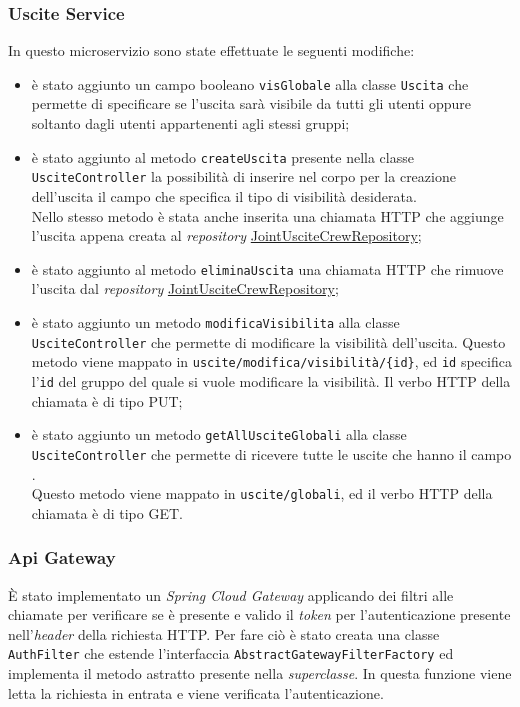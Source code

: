 \subsubsection{Uscite Service}
In questo \gls{microservizio} sono state effettuate le seguenti modifiche:
\begin{itemize}
    \item è stato aggiunto un campo booleano \texttt{visGlobale} alla classe
          \texttt{Uscita} che permette di specificare se l'uscita sarà visibile
          da tutti
          gli utenti oppure soltanto dagli utenti appartenenti agli stessi
          gruppi;
    \item è stato aggiunto al metodo \texttt{createUscita} presente nella
          classe \texttt{UsciteController} la possibilità di inserire nel corpo
          per la
          creazione dell'uscita il campo che specifica il tipo di visibilità
          desiderata.
          \\
          Nello stesso metodo è stata anche inserita una chiamata HTTP che
          aggiunge
          l'uscita appena creata al \textit{repository}
          \hyperref[JointUsciteCrewRepository]{JointUsciteCrewRepository};
    \item è stato aggiunto al metodo \texttt{eliminaUscita} una chiamata HTTP
          che rimuove l'uscita dal \textit{repository}
          \hyperref[JointUsciteCrewRepository]{JointUsciteCrewRepository};
    \item è stato aggiunto un metodo \texttt{modificaVisibilita}  alla classe
          \texttt{UsciteController} che permette di modificare la visibilità
          dell'uscita.
          Questo metodo viene mappato in
          \texttt{uscite/modifica/visibilità/\{id\}},
          ed \texttt{id} specifica l'\texttt{id} del gruppo del quale si vuole
          modificare
          la visibilità. Il verbo HTTP della chiamata è di tipo PUT;
    \item è stato aggiunto un metodo \texttt{getAllUsciteGlobali}  alla classe
          \texttt{UsciteController} che permette di ricevere tutte le uscite
          che hanno il
          campo . \\
          Questo metodo viene mappato in \texttt{uscite/globali}, ed il verbo
          HTTP
          della chiamata è di tipo GET.
\end{itemize}

\subsubsection{Api Gateway}
È stato implementato un \textit{Spring Cloud Gateway} applicando dei filtri
alle chiamate per verificare se è presente e valido il \textit{token} per
l'autenticazione  presente nell'\textit{header} della richiesta HTTP.
Per fare ciò è stato creata una classe \texttt{AuthFilter} che estende
l'interfaccia \texttt{AbstractGatewayFilterFactory} ed implementa il metodo
astratto  presente nella
\textit{superclasse}. In questa funzione viene letta la richiesta in entrata e
viene verificata l'autenticazione.

